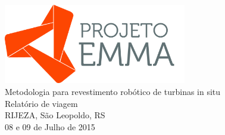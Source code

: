 \vfill%
\begin{center}
  {\GRANDE \raisebox{1.4ex}{} \includegraphics[width=80mm]{logo/projeto-EMMA-logo.jpg}} \\[10mm]
  {\Grande Metodologia para revestimento robótico de turbinas in situ} \\[25mm]
  {\Grande Relatório de viagem} \\[20mm]
  {\large RIJEZA, São Leopoldo, RS} \\[5mm]
  {\large 08 e 09 de Julho de 2015}
  \vfill%
\end{center}

\newpage%
\pagestyle{fancy}%
\thispagestyle{fancy}%
\renewcommand{\headrulewidth}  {0.4pt}%
\renewcommand{\footrulewidth}  {0.4pt}%
%
%
\rhead{\sf\thepage}%
%
\cfoot{}%
\rfoot{\sf [\hours] \quad \today}%
